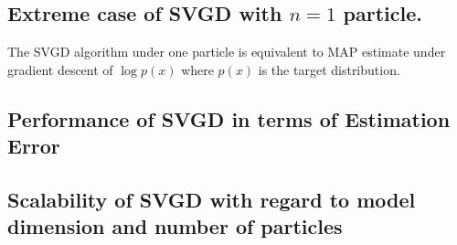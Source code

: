 \subsection{Extreme case of SVGD with $n=1$ particle.} 

The SVGD algorithm under one particle is equivalent to MAP estimate under gradient descent of $\log p(x)$ where $p(x)$ is the target distribution.

\subsection{Performance of SVGD in terms of Estimation Error}


\subsection{Scalability of SVGD with regard to model dimension and number of particles}